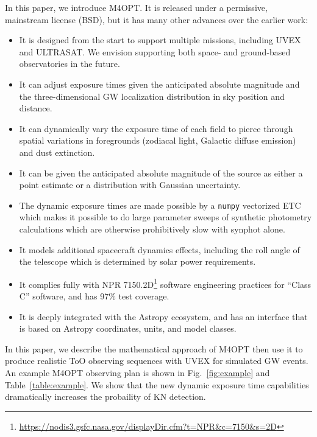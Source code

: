 \documentclass[twocolumn,times]{aastex631}
\begin{document}
In this paper, we introduce \ac{M4OPT}. It is released under a permissive, mainstream license (BSD), but it has many other advances over the earlier work:
%
\begin{itemize}
    \item It is designed from the start to support multiple missions, including \ac{UVEX} and ULTRASAT. We envision supporting both space- and ground-based observatories in the future.
    \item It can adjust exposure times given the anticipated absolute magnitude and the three-dimensional \ac{GW} localization distribution in sky position and distance.
    \item It can dynamically vary the exposure time of each field to pierce through spatial variations in foregrounds (zodiacal light, Galactic diffuse emission) and dust extinction.
    \item It can be given the anticipated absolute magnitude of the source as either a point estimate or a distribution with Gaussian uncertainty.
    \item The dynamic exposure times are made possible by a \texttt{numpy} \citep{harris2020array} vectorized \ac{ETC} which makes it possible to do large parameter sweeps of synthetic photometry calculations which are otherwise prohibitively slow with synphot \citep{2018ascl.soft11001S} alone.
    \item It models additional spacecraft dynamics effects, including the roll angle of the telescope which is determined by solar power requirements.
    \item It complies fully with \ac{NPR} 7150.2D\footnote{\url{https://nodis3.gsfc.nasa.gov/displayDir.cfm?t=NPR&c=7150&s=2D}} software engineering practices for ``Class C'' software, and has 97\% test coverage.
    \item It is deeply integrated with the Astropy \citep{2013A&A...558A..33A,2018AJ....156..123A} ecosystem, and has an interface that is based on Astropy coordinates, units, and model classes.
\end{itemize}

In this paper, we describe the mathematical approach of \ac{M4OPT} then use it to produce realistic \ac{ToO} observing sequences with \ac{UVEX} for simulated \ac{GW} events. An example \ac{M4OPT} observing plan is shown in Fig.~\ref{fig:example} and Table~\ref{table:example}. We show that the new dynamic exposure time capabilities dramatically increases the probaility of \ac{KN} detection.
\end{document}
